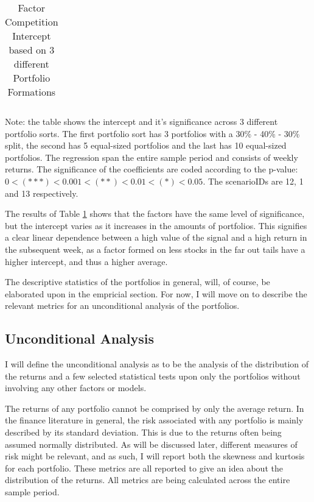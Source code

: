 \begin{table}[ht]
	\centering
	\caption[Comparison of Factor Competition]{Factor Competition Intercept based on 3 different Portfolio Formations}
	\label{tab:factor_competition_impl}
	
	\begin{tabular}{l|lll}
		
	\end{tabular}

	{\small Note: the table shows the intercept and it's significance across 3 different portfolio sorts. The first portfolio sort has 3 portfolios with a 30\% - 40\% - 30\% split, the second has 5 equal-sized portfolios and the last has 10 equal-sized portfolios. The regression span the entire sample period and consists of weekly returns. The significance of  the coefficients are coded according to the p-value: $0 < (\ast\ast\ast) < 0.001 < (\ast\ast) < 0.01 < (\ast) < 0.05$. The scenarioIDs are 12, 1 and 13 respectively.}
\end{table}

The results of Table \ref{tab:factor_competition_impl} shows that the factors have the same level of significance, but the intercept varies as it increases in the amounts of portfolios. This signifies a clear linear dependence between a high value of the signal and a high return in the subsequent week, as a factor formed on less stocks in the far out tails have a higher intercept, and thus a higher average. 

The descriptive statistics of the portfolios in general, will, of course, be elaborated upon in the empricial section. For now, I will move on to describe the relevant metrics for an unconditional analysis of the portfolios. 

\subsection{Unconditional Analysis}

I will define the unconditional analysis as to be the analysis of the distribution of the returns and a few selected statistical tests upon only the portfolios without involving any other factors or models.

The returns of any portfolio cannot be comprised by only the average return. In the finance literature in general, the risk associated with any portfolio is mainly described by its standard deviation. This is due to the returns often being assumed normally distributed. As will be discussed later, different measures of risk might be relevant, and as such, I will report both the skewness and kurtosis for each portfolio. These metrics are all reported to give an idea about the distribution of the returns. All metrics are being calculated across the entire sample period.

